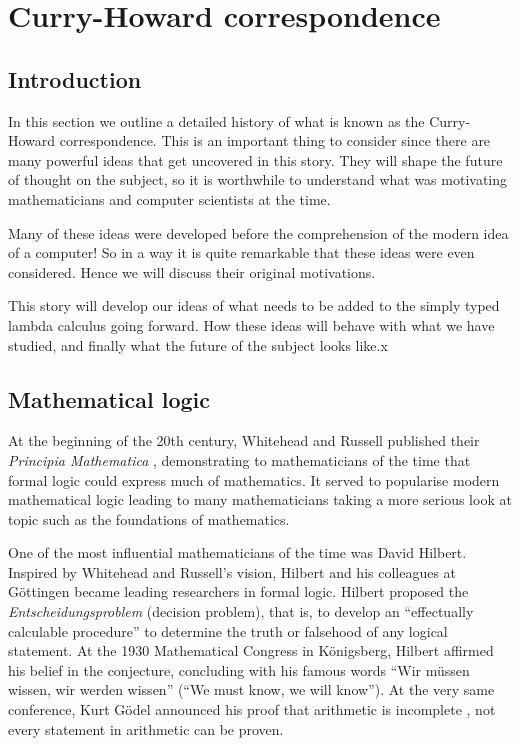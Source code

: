 \section{Curry-Howard correspondence}

\subsection{Introduction}

In this section we outline a detailed history of what is known as the Curry-Howard correspondence. This is an important thing to consider since there are many powerful ideas that get uncovered in this story. They will shape the future of thought on the subject, so it is worthwhile to understand what was motivating mathematicians and computer scientists at the time.

Many of these ideas were developed before the comprehension of the modern idea of a computer! So in a way it is quite remarkable that these ideas were even considered. Hence we will discuss their original motivations.

This story will develop our ideas of what needs to be added to the simply typed lambda calculus going forward. How these ideas will behave with what we have studied, and finally what the future of the subject looks like.x


\subsection{Mathematical logic}\label{logic_chapter}

At the beginning of the 20th century, Whitehead and Russell published their \emph{Principia Mathematica} \cite{GlossarWiki:Whitehead_Russell:1910}, demonstrating to mathematicians of the time that formal logic could express much of mathematics. It served to popularise modern mathematical logic leading to many mathematicians taking a more serious look at topic such as the foundations of mathematics.

One of the most influential mathematicians of the time was David Hilbert. Inspired by Whitehead and Russell's vision, Hilbert and his colleagues at G\"ottingen became leading researchers in formal logic. Hilbert proposed the \emph{Entscheidungsproblem} (decision problem), that is, to develop an ``effectually calculable procedure'' to determine the truth or falsehood of any logical statement. At the 1930 Mathematical Congress in K\"onigsberg, Hilbert affirmed his belief in the conjecture, concluding with his famous words ``Wir m\"ussen wissen, wir werden wissen'' (``We must know, we will know''). At the very same conference, Kurt G\"odel announced his proof that arithmetic is incomplete \cite{GlossarWiki:Goedel:1931}, not every statement in arithmetic can be proven.

